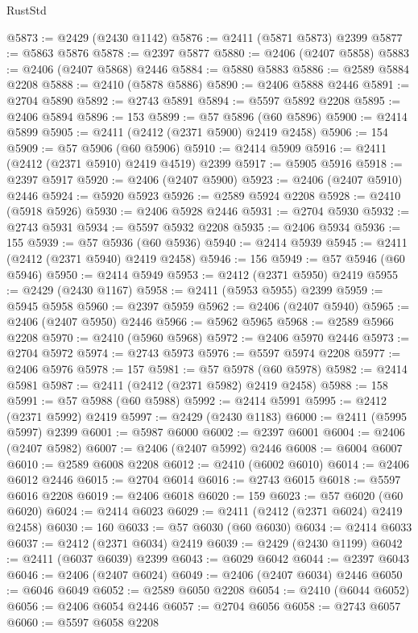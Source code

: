 \begin{lexlean}{RustStd}
\begin{coremodule}
@5873 := @2429 (@2430 @1142)
@5876 := @2411 (@5871 @5873) @2399
@5877 := @5863 @5876
@5878 := @2397 @5877
@5880 := @2406 (@2407 @5858)
@5883 := @2406 (@2407 @5868) @2446
@5884 := @5880 @5883
@5886 := @2589 @5884 @2208
@5888 := @2410 (@5878 @5886)
@5890 := @2406 @5888 @2446
@5891 := @2704 @5890
@5892 := @2743 @5891
@5894 := @5597 @5892 @2208
@5895 := @2406 @5894
@5896 := 153
@5899 := @57 @5896 (@60 @5896)
@5900 := @2414 @5899
@5905 := @2411 (@2412 (@2371 @5900) @2419 @2458)
@5906 := 154
@5909 := @57 @5906 (@60 @5906)
@5910 := @2414 @5909
@5916 := @2411 (@2412 (@2371 @5910) @2419 @4519) @2399
@5917 := @5905 @5916
@5918 := @2397 @5917
@5920 := @2406 (@2407 @5900)
@5923 := @2406 (@2407 @5910) @2446
@5924 := @5920 @5923
@5926 := @2589 @5924 @2208
@5928 := @2410 (@5918 @5926)
@5930 := @2406 @5928 @2446
@5931 := @2704 @5930
@5932 := @2743 @5931
@5934 := @5597 @5932 @2208
@5935 := @2406 @5934
@5936 := 155
@5939 := @57 @5936 (@60 @5936)
@5940 := @2414 @5939
@5945 := @2411 (@2412 (@2371 @5940) @2419 @2458)
@5946 := 156
@5949 := @57 @5946 (@60 @5946)
@5950 := @2414 @5949
@5953 := @2412 (@2371 @5950) @2419
@5955 := @2429 (@2430 @1167)
@5958 := @2411 (@5953 @5955) @2399
@5959 := @5945 @5958
@5960 := @2397 @5959
@5962 := @2406 (@2407 @5940)
@5965 := @2406 (@2407 @5950) @2446
@5966 := @5962 @5965
@5968 := @2589 @5966 @2208
@5970 := @2410 (@5960 @5968)
@5972 := @2406 @5970 @2446
@5973 := @2704 @5972
@5974 := @2743 @5973
@5976 := @5597 @5974 @2208
@5977 := @2406 @5976
@5978 := 157
@5981 := @57 @5978 (@60 @5978)
@5982 := @2414 @5981
@5987 := @2411 (@2412 (@2371 @5982) @2419 @2458)
@5988 := 158
@5991 := @57 @5988 (@60 @5988)
@5992 := @2414 @5991
@5995 := @2412 (@2371 @5992) @2419
@5997 := @2429 (@2430 @1183)
@6000 := @2411 (@5995 @5997) @2399
@6001 := @5987 @6000
@6002 := @2397 @6001
@6004 := @2406 (@2407 @5982)
@6007 := @2406 (@2407 @5992) @2446
@6008 := @6004 @6007
@6010 := @2589 @6008 @2208
@6012 := @2410 (@6002 @6010)
@6014 := @2406 @6012 @2446
@6015 := @2704 @6014
@6016 := @2743 @6015
@6018 := @5597 @6016 @2208
@6019 := @2406 @6018
@6020 := 159
@6023 := @57 @6020 (@60 @6020)
@6024 := @2414 @6023
@6029 := @2411 (@2412 (@2371 @6024) @2419 @2458)
@6030 := 160
@6033 := @57 @6030 (@60 @6030)
@6034 := @2414 @6033
@6037 := @2412 (@2371 @6034) @2419
@6039 := @2429 (@2430 @1199)
@6042 := @2411 (@6037 @6039) @2399
@6043 := @6029 @6042
@6044 := @2397 @6043
@6046 := @2406 (@2407 @6024)
@6049 := @2406 (@2407 @6034) @2446
@6050 := @6046 @6049
@6052 := @2589 @6050 @2208
@6054 := @2410 (@6044 @6052)
@6056 := @2406 @6054 @2446
@6057 := @2704 @6056
@6058 := @2743 @6057
@6060 := @5597 @6058 @2208

\end{coremodule}
\end{lexlean}
